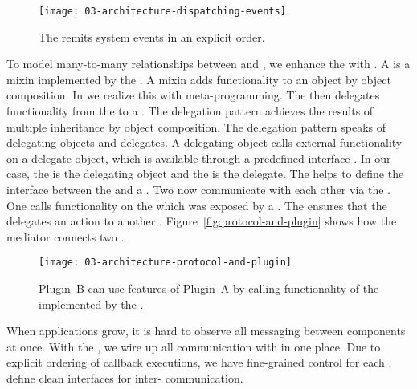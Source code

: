 \documentclass[../03-Architecture.tex]{subfiles}
\begin{document}
\begin{figure}[h]
  \centering
  \texttt{[image: 03-architecture-dispatching-events]}
  \caption{The  remits system events in an explicit order.}
  \label{fig:dispatching-events}
\end{figure}

To model many-to-many relationships between  and
, we enhance the  with
. A  is a mixin implemented by the
. A mixin adds functionality to an object by object
composition\cite{}. In {\javascript}
we realize this with meta-programming. The  then
delegates functionality from the  to a
.
The delegation pattern achieves the results of multiple inheritance by
object composition. The delegation pattern speaks of delegating
objects and delegates. A delegating object calls external
functionality on a delegate object, which is available through a
predefined interface \cite{delegation}. In
our case, the  is the delegating object and the
 is the delegate. The  helps to define
the interface between the  and a . Two
 now communicate with each other via the
. One  calls functionality on the
 which was exposed by a . The
 ensures that the  delegates an
action to another . Figure~\ref{fig:protocol-and-plugin}
shows how the mediator connects two .

\begin{figure}[h]
  \centering
  \texttt{[image: 03-architecture-protocol-and-plugin]}
  \caption{Plugin~B can use features of Plugin~A by calling functionality of the  implemented by the .}
  \label{fig:protocol-and-plugin.}
\end{figure}

When applications grow, it is hard to observe all messaging between
components at once. With the , we wire up all
communication with  in one place. Due to explicit
ordering of callback executions, we have fine-grained control for each
.  define clean interfaces for
inter- communication.
\end{document}
